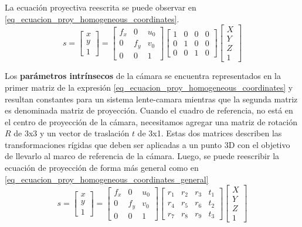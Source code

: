 \documentclass[a4paper,11pt,spanish]{article}
\begin{document}
La ecuación proyectiva reescrita se puede observar en \eqref{eq_ecuacion_proy_homogeneous_coordinates}.
\begin{equation}
  s=\begin{bmatrix}x\\
  y\\
  1
  \end{bmatrix}=\begin{bmatrix}f_{x} & 0 & u_{0}\\
  0 & f_{y} & v_{0}\\
  0 & 0 & 1
  \end{bmatrix}\begin{bmatrix}1 & 0 & 0 & 0\\
  0 & 1 & 0 & 0\\
  0 & 0 & 1 & 0
  \end{bmatrix}\begin{bmatrix}X\\
  Y\\
  Z\\
  1
  \end{bmatrix}
  \label{eq_ecuacion_proy_homogeneous_coordinates}
\end{equation}

Los \textbf{parámetros intrínsecos} de la cámara se encuentra representados en la primer matriz de la expresión \eqref{eq_ecuacion_proy_homogeneous_coordinates} y resultan constantes para un sistema lente-camara mientras que la segunda matriz es denominada matriz de proyección. Cuando el cuadro de referencia, no está en el centro de proyección de la cámara, necesitamos agregar una matriz de rotación $R$ de 3x3 y un vector de traslación $t$ de 3x1. Estas dos matrices describen las transformaciones rígidas que deben ser aplicadas a un punto 3D con el objetivo de llevarlo al marco de referencia de la cámara. Luego, se puede reescribir la ecuación de proyección de forma más general como en \eqref{eq_ecuacion_proy_homogeneous_coordinates_general}
\begin{equation}
  s=\begin{bmatrix}x\\
  y\\
  1
  \end{bmatrix}=\begin{bmatrix}f_{x} & 0 & u_{0}\\
  0 & f_{y} & v_{0}\\
  0 & 0 & 1
  \end{bmatrix}\begin{bmatrix}r_1 & r_2 & r_3 & t_1\\
  r_4 & r_5 & r_6 & t_2\\
  r_7 & r_8 & r_9 & t_3
  \end{bmatrix}\begin{bmatrix}X\\
  Y\\
  Z\\
  1
  \end{bmatrix}
  \label{eq_ecuacion_proy_homogeneous_coordinates_general}
\end{equation}
\end{document}
